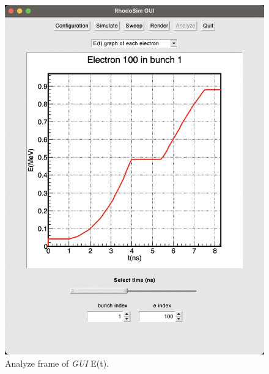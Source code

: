 \documentclass[a4paper,oneside,12pt]{report}
\numberwithin{equation}{chapter}
\begin{document}
\begin{figure}
    \centering
    \includegraphics[width=\linewidth]{./figures/rhodoSim/GUI_analyze_Et_2.png}
    \caption{Analyze frame of \textit{GUI} E(t).}
    \label{fig:gui_analyze_Et2}
\end{figure}
\end{document}
